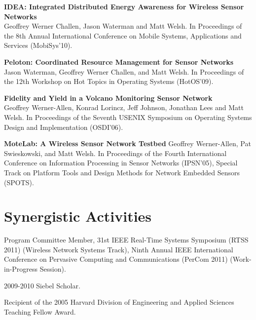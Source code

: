 \documentclass[11pt,letterpaper]{article}
\begin{document}
\begin{list}{}{\leftmargin=1em}

\item \textbf{IDEA: Integrated Distributed Energy Awareness for Wireless
Sensor Networks}\\
Geoffrey Werner Challen, Jason Waterman and Matt Welsh. In Proceedings of the
8th Annual International Conference on Mobile Systems, Applications and
Services (MobiSys'10).

\item \textbf{Peloton: Coordinated Resource Management for Sensor Networks}\\
Jason Waterman, Geoffrey Werner Challen, and Matt Welsh. In Proceedings of
the 12th Workshop on Hot Topics in Operating Systems (HotOS'09).

\item \textbf{Fidelity and Yield in a Volcano Monitoring Sensor Network}\\
Geoffrey Werner-Allen, Konrad Lorincz, Jeff Johnson, Jonathan Lees and Matt
Welsh. In Proceedings of the Seventh USENIX Symposium on Operating Systems
Design and Implementation (OSDI'06).

\item \textbf{MoteLab: A Wireless Sensor Network Testbed}
Geoffrey Werner-Allen, Pat Swieskowski, and Matt Welsh. In Proceedings of the
Fourth International Conference on Information Processing in Sensor Networks
(IPSN'05), Special Track on Platform Tools and Design Methods for Network
Embedded Sensors (SPOTS).

\end{list}

\section*{Synergistic Activities}

\begin{list}{}{\leftmargin=1em}

\item Program Committee Member, 31st IEEE Real-Time Systems Symposium (RTSS
2011) (Wireless Network Systems Track), Ninth Annual IEEE International
Conference on Pervasive Computing and Communications (PerCom 2011)
(Work-in-Progress Session).

\item 2009-2010 Siebel Scholar.

\item Recipient of the 2005 Harvard Division of Engineering and Applied
Sciences Teaching Fellow Award.

\end{list}
\end{document}
